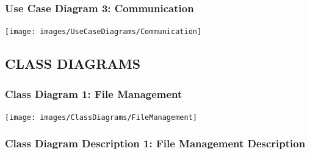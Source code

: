 \documentclass[twoside,letterpaper]{article}
\begin{document}
	\newpage
	
	\subsubsection[Use Case Diagram 3: Communication]{\rmfamily\bfseries\color{black}
		Use Case Diagram 3: Communication}
	
	\texttt{[image: images/UseCaseDiagrams/Communication]}
	
	\newpage



\subsection[CLASS DIAGRAMS]{\rmfamily\bfseries CLASS DIAGRAMS}
	\subsubsection[Class Diagram 1: File Management]{\rmfamily\bfseries\color{black}
		Class Diagram 1: File Management}
	\hypertarget{RefHeading22059017292}{}
	\bigskip
	
	\texttt{[image: images/ClassDiagrams/FileManagement]}
	
	\newpage
	
	\subsubsection[Class Diagram Description 1: File Management Description]{\rmfamily\bfseries\color{black}
		Class Diagram Description 1: File Management Description}
	\hypertarget{RefHeading22059017292}{}
	
\end{document}

